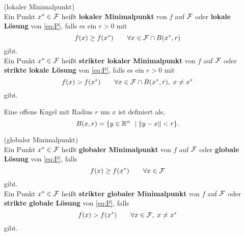\begin{Definition}(lokaler Minimalpunkt)~ \\
	Ein Punkt $x^\ast\in\mathcal{F}$ hei\ss t \textbf{lokaler Minimalpunkt} von $f$ auf $\mathcal{F}$ oder \textbf{lokale L\"osung} von \eqref{eq:P}, falls es ein $r>0$ mit
	\begin{equation*}
		f(x)\geq f(x^\ast) \qquad \forall x\in\mathcal{F} \cap B(x^\ast,r)
	\end{equation*}
	gibt. \vspace{5pt}\\
	Ein Punkt $x^\ast\in\mathcal{F}$ hei\ss t \textbf{strikter lokaler Minimalpunkt} von $f$ auf $\mathcal{F}$ oder \textbf{strikte lokale L\"osung} von \eqref{eq:P}, falls es ein $r>0$ mit
	\begin{equation*}
	f(x)> f(x^\ast) \qquad \forall x\in\mathcal{F} \cap B(x^\ast,r),\; x\neq x^\ast
	\end{equation*}
	gibt.
\end{Definition}

\begin{Bemerkung} Eine offene Kugel mit Radius $r$ um $x$ ist definiert als,
\begin{equation*}
	B(x,r) = \lbrace y\in\mathbb R^n ~\mid \left\lVert y-x\right\rVert<r \rbrace.
\end{equation*}
\begin{center}
\end{center}
\end{Bemerkung}


\begin{Definition}(globaler Minimalpunkt)~ \\
	Ein Punkt $x^\ast\in\mathcal{F}$ hei\ss t \textbf{globaler Minimalpunkt} von $f$ auf $\mathcal{F}$ oder \textbf{globale L\"osung} von \eqref{eq:P}, falls 
	\begin{equation*}
	f(x)\geq f(x^\ast) \qquad \forall x\in\mathcal{F} 
	\end{equation*}
	gibt. \vspace{5pt}\\
	Ein Punkt $x^\ast\in\mathcal{F}$ hei\ss t \textbf{strikter globaler Minimalpunkt} von $f$ auf $\mathcal{F}$ oder \textbf{strikte globale L\"osung} von \eqref{eq:P}, falls 
	\begin{equation*}
	f(x)> f(x^\ast) \qquad \forall x\in\mathcal{F} ,\; x\neq x^\ast
	\end{equation*}
	gibt.
\end{Definition}

